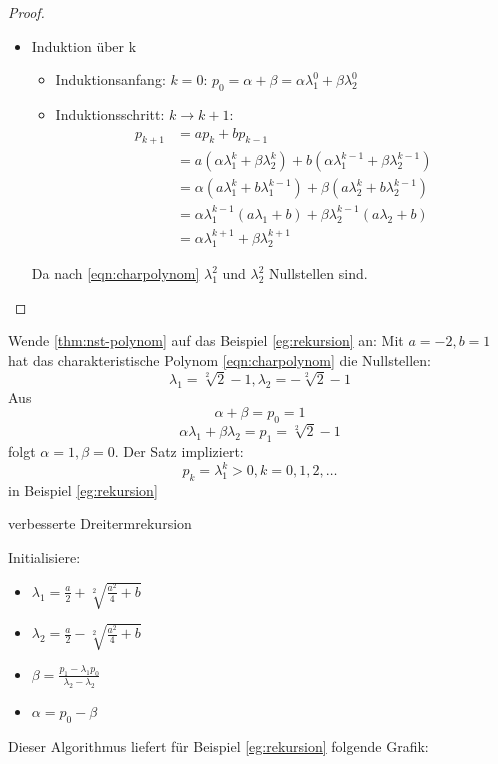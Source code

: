 \begin{proof}
\begin{itemize}
	\item Induktion über k\medskip
\begin{itemize}[label=$\lozenge$, itemsep=2ex]
\item Induktionsanfang: \underline{$k=0$}: 
	$p_0=\alpha+\beta = \alpha \lambda_1^{0}+\beta \lambda_2^{0}$
\item Induktionsschritt: \underline{$k \to k+1$}:
	\begin{align*}
	p_{k+1}
	&=ap_k +bp_{k-1} \\
	&= a(\alpha \lambda_1^{k}+ \beta \lambda_2^{k}) + b(\alpha \lambda_1^{k-1}+\beta \lambda_2^{k-1}) \\
	&= \alpha (a \lambda_1^{k}+ b\lambda_1^{k-1})+ \beta (a \lambda_2^{k}+ b \lambda_2^{k-1}) \\
	&= \alpha \lambda_1^{k-1}(a\lambda_1+b) + \beta \lambda_2^{k-1}(a\lambda_2 +b)\\
	&= \alpha \lambda_1^{k+1} + \beta \lambda_2^{k+1}
	\end{align*}
\end{itemize}
Da nach \eqref{eqn:charpolynom} $\lambda_1^2$ und $\lambda_2^2$ Nullstellen sind.
\end{itemize}
\end{proof}
Wende \ref{thm:nst-polynom} auf das Beispiel \ref{eg:rekursion} an: Mit $a=-2, b=1$ hat das charakteristische Polynom \eqref{eqn:charpolynom} die Nullstellen:
\[
\lambda_1= \sqrt[2]{2}-1, \lambda_2= -\sqrt[2]{2}-1 
\]
Aus
\[
\alpha + \beta =p_0 =1
\]
\[
\alpha \lambda_1 + \beta \lambda_2= p_1 = \sqrt[2]{2}-1
\]
folgt $\alpha = 1, \beta = 0$. Der Satz \label{thm:nst-polynom} impliziert:
\[
p_k= \lambda_1^{k}> 0, k=0,1,2,\ldots
\]
in Beispiel \ref{eg:rekursion}\\
\begin{algorithm}[H]
\label{alg:rekursion}
 \caption{verbesserte Dreitermrekursion}
Initialisiere:
\begin{itemize}
	\item $\lambda_1 = \frac{a}{2}+\sqrt[2]{\frac{a^2}{4}+b}$
	\item $\lambda_2= \frac{a}{2}-\sqrt[2]{\frac{a^2}{4}+b}$
	\item $\beta= \frac{p_1-\lambda_1p_0}{\lambda_2-\lambda_2}$
	\item $\alpha = p_0-\beta$
\end{itemize}
\end{algorithm}
Dieser Algorithmus liefert für Beispiel \ref{eg:rekursion} folgende Grafik:

